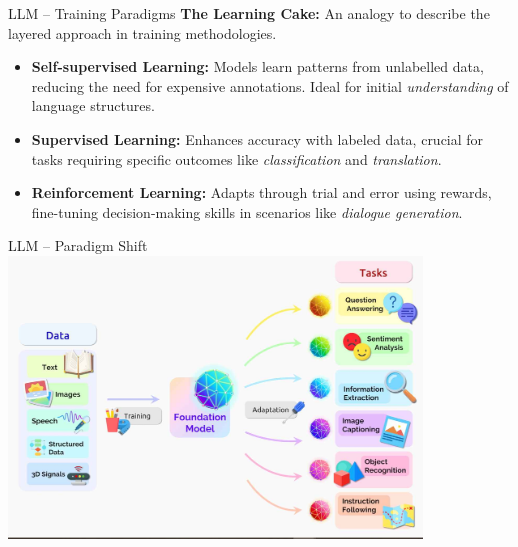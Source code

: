\documentclass[presentation, 10pt]{beamer}\mode<presentation>{\usetheme{AMSBolognaFC}}
\begin{document}
\begin{frame}{LLM -- Training Paradigms}
\textbf{The Learning Cake:} An analogy to describe the layered approach in training methodologies.
\begin{itemize}
    \item \textbf{Self-supervised Learning:} Models learn patterns from unlabelled data, reducing the need for expensive annotations. Ideal for initial \emph{understanding} of language structures.
    \item \textbf{Supervised Learning:} Enhances accuracy with labeled data, crucial for tasks requiring specific outcomes like \emph{classification} and \emph{translation}.
    \item \textbf{Reinforcement Learning:} Adapts through trial and error using rewards, fine-tuning decision-making skills in scenarios like \emph{dialogue generation}.
\end{itemize}
\end{frame}
\begin{frame}{LLM -- Paradigm Shift}
	\centering
	\includegraphics[height=7.5cm]{img/llm-idea.jpg}
\end{frame}
			
\end{document}
